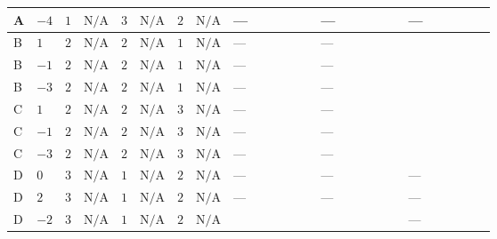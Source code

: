 \documentclass[8pt]{article}
\begin{document}
\begin{landscape}
\begin{longtable}{@{}llcccccc >{\raggedright\arraybackslash}p{0.21\linewidth} >{\raggedright\arraybackslash}p{0.21\linewidth} >{\raggedright\arraybackslash}p{0.21\linewidth}@{}}
\midrule
A & $-4$ & $1$ & $\text{N/A}$ & $3$ & $\text{N/A}$ & $2$ & $\text{N/A}$ & --- & --- & --- \\
\midrule
B & $1$ & $2$ & $\text{N/A}$ & $2$ & $\text{N/A}$ & $1$ & $\text{N/A}$ & --- & --- & \scriptsize\adjustbox{max width=\linewidth}{$\begin{gathered} -\frac{9 {g_2}^2 {m_2^2}}{2}\end{gathered}$} \\
\midrule
B & $-1$ & $2$ & $\text{N/A}$ & $2$ & $\text{N/A}$ & $1$ & $\text{N/A}$ & --- & --- & \scriptsize\adjustbox{max width=\linewidth}{$\begin{gathered} -\frac{9 {g_2}^2 {m_2^2}}{2}\end{gathered}$} \\
\midrule
B & $-3$ & $2$ & $\text{N/A}$ & $2$ & $\text{N/A}$ & $1$ & $\text{N/A}$ & --- & --- & \scriptsize\adjustbox{max width=\linewidth}{$\begin{gathered} -\frac{9 {g_2}^2 {m_2^2}}{2}\end{gathered}$} \\
\midrule
C & $1$ & $2$ & $\text{N/A}$ & $2$ & $\text{N/A}$ & $3$ & $\text{N/A}$ & --- & --- & \scriptsize\adjustbox{max width=\linewidth}{$\begin{gathered} -\frac{9 {g_2}^2 {m_2^2}}{2}\end{gathered}$} \\
\midrule
C & $-1$ & $2$ & $\text{N/A}$ & $2$ & $\text{N/A}$ & $3$ & $\text{N/A}$ & --- & --- & \scriptsize\adjustbox{max width=\linewidth}{$\begin{gathered} -\frac{9 {g_2}^2 {m_2^2}}{2}\end{gathered}$} \\
\midrule
C & $-3$ & $2$ & $\text{N/A}$ & $2$ & $\text{N/A}$ & $3$ & $\text{N/A}$ & --- & --- & \scriptsize\adjustbox{max width=\linewidth}{$\begin{gathered} -\frac{9 {g_2}^2 {m_2^2}}{2}\end{gathered}$} \\
\midrule
D & $0$ & $3$ & $\text{N/A}$ & $1$ & $\text{N/A}$ & $2$ & $\text{N/A}$ & --- & --- & --- \\
\midrule
D & $2$ & $3$ & $\text{N/A}$ & $1$ & $\text{N/A}$ & $2$ & $\text{N/A}$ & --- & --- & --- \\
\midrule
D & $-2$ & $3$ & $\text{N/A}$ & $1$ & $\text{N/A}$ & $2$ & $\text{N/A}$ & \scriptsize\adjustbox{max width=\linewidth}{$\begin{gathered} 12 {\mu_{\mathrm{T3GeneralS2Sq}}} \left({\lambda_{X_{2}}}\right)^{*}\end{gathered}$} & \scriptsize\adjustbox{max width=\linewidth}{$\begin{gathered} +12 {\lambda_{X_{2}}} \left({\mu_{\mathrm{T3GeneralS2Sq}}}\right)^{*}\end{gathered}$} & --- \\

\end{longtable}
\end{landscape}
\end{document}
